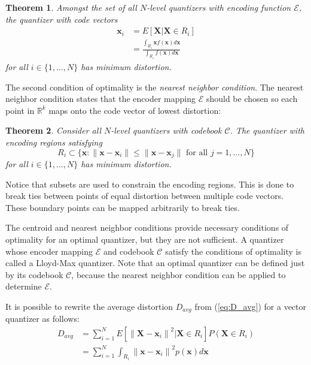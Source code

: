 \documentclass[10pt,twoside,titlepage]{article}
\newtheorem{theorem}{Theorem}[section]
\newcommand{\bx}{\mathbf{x}}
\newcommand{\bX}{\mathbf{X}}
\begin{document}
\begin{theorem}
\label{theo:cent_vq}
Amongst the set of all $N$-level quantizers with encoding function $\mathcal{E}$, the quantizer with code vectors
\begin{align}
  \label{eq:cent_vq}
  \bx_i &= E[\bX | \bX \in R_i] \\
&= \frac{ \int_{R_i}\bx f(\bx)d\bx }{ \int_{R_i}f(\bx)d\bx }
\end{align}
for all $i \in \{1,\ldots,N\}$ has minimum distortion.
\end{theorem}

The second condition of optimality is the \emph{nearest neighbor condition}. The nearest neighbor condition states that the encoder mapping $\mathcal{E}$ should be chosen so each point in $\mathbb{R}^k$ maps onto the code vector of lowest distortion:

\begin{theorem}
Consider all $N$-level quantizers with codebook $\mathcal{C}$. The quantizer with encoding regions satisfying
\begin{equation*}
R_i \subset \{\bx : \| \bx - \bx_i \| \le \| \bx - \bx_j \| \text{ for all } j = 1,\ldots,N \}
\end{equation*}
for all $i \in \{1,\ldots,N\}$ has minimum distortion.
\end{theorem}

Notice that subsets are used to constrain the encoding regions. This is done to break ties between points of equal distortion between multiple code vectors. These boundary points can be mapped arbitrarily to break ties.

The centroid and nearest neighbor conditions provide necessary conditions of optimality for an optimal quantizer, but they are not sufficient. A quantizer whose encoder mapping $\mathcal{E}$ and codebook $\mathcal{C}$ satisfy the conditions of optimality is called a Lloyd-Max quantizer. Note that an optimal quantizer can be defined just by its codebook $\mathcal{C}$, because the nearest neighbor condition can be applied to determine $\mathcal{E}$.

It is possible to rewrite the average distortion $D_{avg}$ from (\ref{eq:D_avg}) for a vector quantizer as follows:
\begin{align*}
D_{avg} &= \sum_{i=1}^{N} E[ {\| \bX -  \bx_i\|}^2 | \bX \in R_i] P(\bX \in R_i) \\
&= \sum_{i=1}^{N} \int_{R_i} {\|\bx - \bx_i\|}^2 p(\bx) d\bx
\end{align*}
\end{document}
